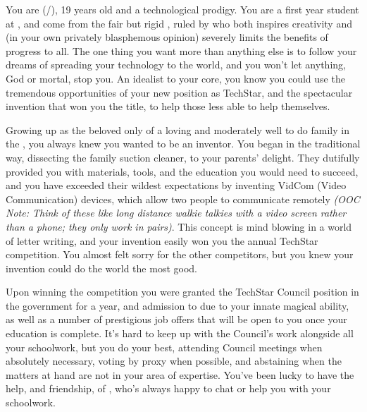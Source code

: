 \documentclass[char]{GL2020}
\begin{document}
\name{\cTechStar{}}

You are \cTechStar{\full} (\cTechStar{\they}/\cTechStar{\them}), 19 years old and a technological prodigy.  You are a first year student at \pSchool{}, and come from the fair but rigid \pTech{}, ruled by \cTechGod{} who both inspires creativity and (in your own privately blasphemous opinion) severely limits the benefits of progress to all. The one thing you want more than anything else is to follow your dreams of spreading your technology to the world, and you won't let anything, God or mortal, stop you.  An idealist to your core, you know you could use the tremendous opportunities of your new position as TechStar, and the spectacular invention that won you the title, to help those less able to help themselves.

Growing up as the beloved only \cTechStar{\child} of a loving and moderately well to do family in the \pTech{}, you always knew you wanted to be an inventor.  You began in the traditional way, dissecting the family suction cleaner, to your parents' delight.  They dutifully provided you with materials, tools, and the education you would need to succeed, and you have exceeded their wildest expectations by inventing VidCom (Video Communication) devices, which allow two people to communicate remotely \emph{(OOC Note: Think of these like long distance walkie talkies with a video screen rather than a phone; they only work in pairs)}.  This concept is mind blowing in a world of letter writing, and your invention easily won you the annual TechStar competition. You almost felt sorry for the other competitors, but you knew your invention could do the world the most good.  

Upon winning the competition you were granted the TechStar Council position in the government for a year, and admission to \pSchool{} due to your innate magical ability, as well as a number of prestigious job offers that will be open to you once your education is complete. It's hard to keep up with the Council's work alongside all your schoolwork, but you do your best, attending Council meetings when absolutely necessary, voting by proxy when possible, and abstaining when the matters at hand are not in your area of expertise. You've been lucky to have the help, and friendship, of \cScholarship{\full}, who's always happy to chat or help you with your schoolwork.
\end{document}
